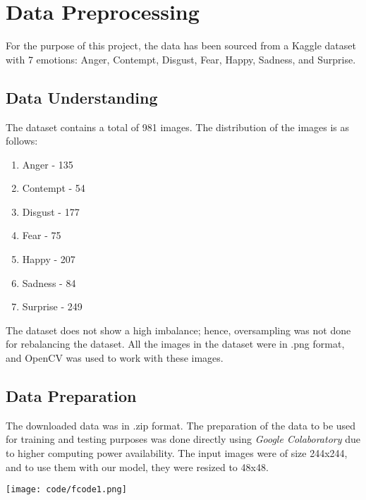 \documentclass[11pt]{article}
\begin{document}
\section{Data Preprocessing}
\normalsize{For the purpose of this project, the data has been sourced from a Kaggle dataset \cite{kaggle} with 7 emotions: Anger, Contempt, Disgust, Fear, Happy, Sadness, and Surprise.}
\subsection{Data Understanding}
\normalsize{The dataset contains a total of 981 images. The distribution of the images is as follows:
\begin{enumerate}
    \item Anger - 135
    \item Contempt - 54
    \item Disgust - 177
    \item Fear - 75
    \item Happy - 207
    \item Sadness - 84
    \item Surprise - 249
\end{enumerate}
The dataset does not show a high imbalance; hence, oversampling was not done for rebalancing the dataset. All the images in the dataset were in .png format, and OpenCV was used to work with these images.}
\subsection{Data Preparation}
The downloaded data was in .zip format. The preparation of the data to be used for training and testing purposes was done directly using \textit{Google Colaboratory} due to higher computing power availability. The input images were of size 244x244, and to use them with our model, they were resized to 48x48.
\begin{center}
    \texttt{[image: code/fcode1.png]}
\end{center}
\end{document}
